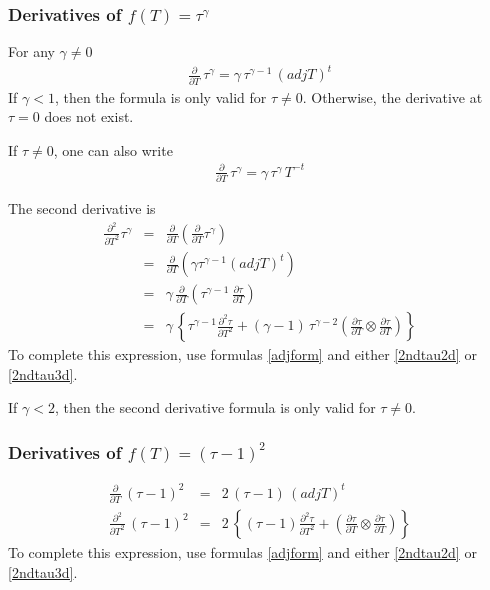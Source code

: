 \documentclass{report}
\begin{document}
\subsubsection{Derivatives of $f(T)=\tau^\gamma$ \label{taugamma}}

For any $\gamma \neq 0$ 
\begin{eqnarray}
\frac{\partial}{\partial T} \, \tau^\gamma = \gamma \, \tau^{\gamma-1} \, (adj T)^t
\end{eqnarray}
If $\gamma<1$, then the formula is only valid for $\tau \neq 0$. 
Otherwise, the derivative at $\tau=0$ does not exist. \newline

\noindent If $\tau \neq 0$, one can also write
\begin{eqnarray}
\frac{\partial}{\partial T} \, \tau^\gamma = \gamma \, \tau^{\gamma} \, T^{-t}
\end{eqnarray}

\noindent The second derivative is
\begin{eqnarray}
\frac{\partial^2}{\partial T^2} \tau^\gamma & = & \frac{\partial}{\partial T} \left( \frac{\partial}{\partial T} \tau^\gamma \right) \nonumber \\
 & = &  \frac{\partial}{\partial T} \left( \gamma \tau^{\gamma-1} (adj T)^t \right) \nonumber \\
 & = & \gamma \,  \frac{\partial}{\partial T} \left( \tau^{\gamma-1} \, \frac{\partial \tau}{\partial T} \right) \nonumber \\
 & = & \gamma \, \left\{ \tau^{\gamma-1} \frac{\partial^2 \tau}{\partial T^2} + (\gamma-1) \, \tau^{\gamma-2} \left( \frac{\partial \tau}{\partial T} \otimes \frac{\partial \tau}{\partial T} \right) \right\}
\end{eqnarray}
To complete this expression, use formulas \ref{adjform} and either 
\ref{2ndtau2d} or \ref{2ndtau3d}. \newline

\noindent If $\gamma < 2$, then the second derivative formula is only valid for $\tau \neq 0$. \newline

\subsubsection{Derivatives of $f(T)=(\tau-1)^2$}

\begin{eqnarray}
\frac{\partial}{\partial T} \, (\tau-1)^2 & = & 2 \, (\tau-1) \, (adj T)^t  \label{tauminus1} \\
\frac{\partial^2}{\partial T^2} \, (\tau-1)^2 & = & 2 \, \left\{ (\tau-1) \frac{\partial^2 \tau}{\partial T^2} + \left( \frac{\partial \tau}{\partial T} \otimes \frac{\partial \tau}{\partial T} \right) \right\}  \label{tm1}
\end{eqnarray}
To complete this expression, use formulas \ref{adjform} and either 
\ref{2ndtau2d} or \ref{2ndtau3d}. \newline
\end{document}
